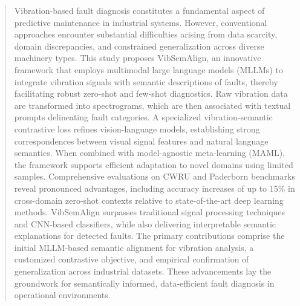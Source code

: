 \begin{abstract}
Vibration-based fault diagnosis constitutes a fundamental aspect of predictive maintenance in industrial systems. However, conventional approaches encounter substantial difficulties arising from data scarcity, domain discrepancies, and constrained generalization across diverse machinery types. This study proposes VibSemAlign, an innovative framework that employs multimodal large language models (MLLMs) to integrate vibration signals with semantic descriptions of faults, thereby facilitating robust zero-shot and few-shot diagnostics. Raw vibration data are transformed into spectrograms, which are then associated with textual prompts delineating fault categories. A specialized vibration-semantic contrastive loss refines vision-language models, establishing strong correspondences between visual signal features and natural language semantics. When combined with model-agnostic meta-learning (MAML), the framework supports efficient adaptation to novel domains using limited samples. Comprehensive evaluations on CWRU and Paderborn benchmarks reveal pronounced advantages, including accuracy increases of up to 15\% in cross-domain zero-shot contexts relative to state-of-the-art deep learning methods. VibSemAlign surpasses traditional signal processing techniques and CNN-based classifiers, while also delivering interpretable semantic explanations for detected faults. The primary contributions comprise the initial MLLM-based semantic alignment for vibration analysis, a customized contrastive objective, and empirical confirmation of generalization across industrial datasets. These advancements lay the groundwork for semantically informed, data-efficient fault diagnosis in operational environments.
\end{abstract}
